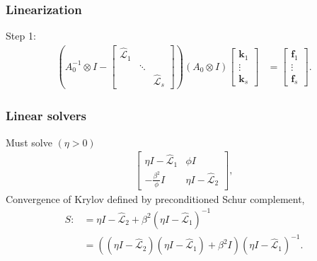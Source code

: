 \documentclass[blue]{beamer}
\begin{document}
\begin{frame}
\frametitle{Linearization}

Step 1:
%
\begin{align*}
\left( A_0^{-1}\otimes I - \begin{bmatrix} \widehat{\mathcal{L}}_1  & \\ & \ddots \\ && \widehat{\mathcal{L}}_s\end{bmatrix}\right)
    (A_0\otimes I)  \begin{bmatrix} \mathbf{k}_1 \\ \vdots \\ \mathbf{k}_s \end{bmatrix}
& = \begin{bmatrix} \mathbf{f}_1 \\ \vdots \\ \mathbf{f}_s \end{bmatrix}.
\end{align*}
%
\end{frame}


\begin{frame}
\frametitle{Linear solvers}

Must solve $(\eta > 0)$
%
\begin{align*}
\begin{bmatrix} \eta I - \widehat{\mathcal{L}}_1 & \phi I\\
-\frac{\beta^2}{\phi} I & \eta I - \widehat{\mathcal{L}}_2\end{bmatrix},
\end{align*}
%
Convergence of Krylov defined by preconditioned Schur complement,
%
\begin{align*}
S :& = \eta I - \widehat{\mathcal{L}}_2 + \beta^2 (\eta I - \widehat{\mathcal{L}}_1)^{-1} \\
& = \left( (\eta I - \widehat{\mathcal{L}}_2) (\eta I - \widehat{\mathcal{L}}_1)
    + \beta^2 I \right)(\eta I - \widehat{\mathcal{L}}_1)^{-1}.
\end{align*}
%
\end{frame}
\end{document}

